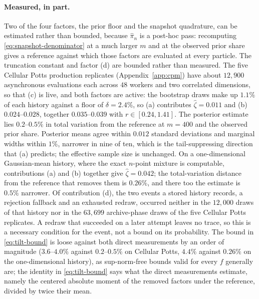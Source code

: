 \documentclass[10pt]{article}
\theoremstyle{plain}
\theoremstyle{definition}
\begin{document}
\paragraph{Measured, in part.} Two of the four factors, the prior floor and the snapshot quadrature, can be estimated rather than bounded, because $\widehat\pi_n$ is a post-hoc pass: recomputing \eqref{eq:snapshot-denominator} at a much larger $m$ and at the observed prior share gives a reference against which those factors are evaluated at every particle. The truncation constant and factor (d) are bounded rather than measured. The five Cellular Potts production replicates (Appendix~\ref{app:cpm}) have about $12{,}900$ asynchronous evaluations each across $48$ workers and two correlated dimensions, so that (c) is live, and both factors are active: the bootstrap draws make up $1.1\%$ of each history against a floor of $\delta=2.4\%$, so (a) contributes $\widehat\zeta=0.011$ and (b) $0.024$--$0.028$, together $0.035$--$0.039$ with $r\in[0.24,1.41]$. The posterior estimate lies $0.2$--$0.5\%$ in total variation from the reference at $m=400$ and the observed prior share. Posterior means agree within $0.012$ standard deviations and marginal widths within $1\%$, narrower in nine of ten, which is the tail-suppressing direction that (a) predicts; the effective sample size is unchanged. On a one-dimensional Gaussian-mean history, where the exact $n$-point mixture is computable, contributions (a) and (b) together give $\widehat\zeta=0.042$; the total-variation distance from the reference that removes them is $0.26\%$, and there too the estimate is $0.5\%$ narrower. Of contribution (d), the two events a stored history records, a rejection fallback and an exhausted redraw, occurred neither in the $12{,}000$ draws of that history nor in the $63{,}699$ archive-phase draws of the five Cellular Potts replicates. A redraw that succeeded on a later attempt leaves no trace, so this is a necessary condition for the event, not a bound on its probability. The bound in \eqref{eq:tilt-bound} is loose against both direct measurements by an order of magnitude ($3.6$--$4.0\%$ against $0.2$--$0.5\%$ on Cellular Potts, $4.4\%$ against $0.26\%$ on the one-dimensional history), as sup-norm-free bounds valid for every $f$ generally are; the identity in \eqref{eq:tilt-bound} says what the direct measurements estimate, namely the centered absolute moment of the removed factors under the reference, divided by twice their mean.
\end{document}
